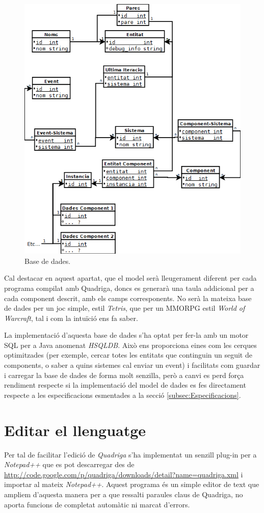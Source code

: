   \begin{figure}
    \includegraphics[width=1\linewidth]{./img/BBDDRelacional.png}
    \caption{Base de dades. \label{fig:BBDDRelacional}}
  \end{figure}
  
  Cal destacar en aquest apartat, que el model serà lleugerament diferent per cada programa compilat amb Quadriga, doncs es generarà una taula addicional per a cada component descrit, amb els camps corresponents. No serà la mateixa base de dades per un joc simple, estil {\em Tetris}, que per un MMORPG estil {\em World of Warcraft}, tal i com la intuïció ens fa saber.
  
  La implementació d'aquesta base de dades s'ha optat per fer-la amb un motor SQL per a Java anomenat {\em HSQLDB}. Això ens proporciona eines com les cerques optimitzades (per exemple, cercar totes les entitats que continguin un seguit de components, o saber a quins sistemes cal enviar un event) i facilitats com guardar i carregar la base de dades de forma molt senzilla, però a canvi es perd força rendiment respecte si la implementació del model de dades es fes directament respecte a les especificacions esmentades a la secció \ref{subsec:Especificacions}.

\section{Editar el llenguatge}

  Per tal de facilitar l'edició de {\em Quadriga} s'ha implementat un senzill plug-in per a {\em Notepad++} que es pot descarregar des de \url{http://code.google.com/p/quadriga/downloads/detail?name=quadriga.xml} i importar al mateix {\em Notepad++}. Aquest programa és un simple editor de text que ampliem d'aquesta manera per a que ressalti paraules claus de Quadriga, no aporta funcions de completat automàtic ni marcat d'errors.